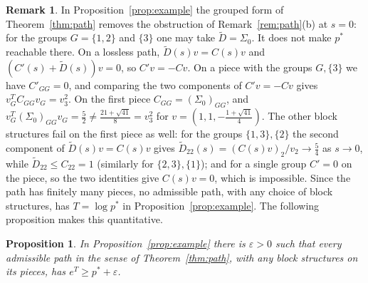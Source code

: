 \documentclass[11pt]{amsart}
\newtheorem{proposition}[theorem]{Proposition}
\theoremstyle{definition}
\newtheorem{remark}[theorem]{Remark}
\begin{document}
\begin{remark}\label{rem:groups}
In Proposition~\ref{prop:example} the grouped form of Theorem~\ref{thm:path} removes the obstruction of
Remark~\ref{rem:path}(b) at $s=0$: for the groups $G=\{1,2\}$ and $\{3\}$ one may take $\tilde D=\Sigma_0$. It does
not make $p^*$ reachable there. On a lossless path, $\tilde D(s)v=C(s)v$ and $(C'(s)+\tilde D(s))v=0$, so $C'v=-Cv$.
On a piece with the groups $G,\{3\}$ we have $C'_{GG}=0$, and comparing the two components of $C'v=-Cv$ gives
$v_G^TC_{GG}v_G=v_3^2$. On the first piece $C_{GG}=(\Sigma_0)_{GG}$, and
$v_G^T(\Sigma_0)_{GG}v_G=\frac52\ne\frac{21+\sqrt{41}}8=v_3^2$ for $v=(1,1,-\frac{1+\sqrt{41}}4)$. The other block
structures fail on the first piece as well: for the groups $\{1,3\},\{2\}$ the second component of
$\tilde D(s)v=C(s)v$ gives $\tilde D_{22}(s)=(C(s)v)_2/v_2\to\frac54$ as $s\to0$, while $\tilde D_{22}\le C_{22}=1$
(similarly for $\{2,3\},\{1\}$); and for a single group $C'=0$ on the piece, so the two identities give $C(s)v=0$,
which is impossible. Since the path has finitely many pieces, no admissible path, with any choice of block
structures, has $T=\log p^*$ in Proposition~\ref{prop:example}. The following proposition makes this quantitative.
\end{remark}

\begin{proposition}\label{prop:away}
In Proposition~\ref{prop:example} there is $\varepsilon>0$ such that every admissible path in the sense of
Theorem~\ref{thm:path}, with any block structures on its pieces, has $e^T\ge p^*+\varepsilon$.
\end{proposition}
\end{document}
